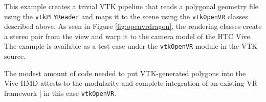 This example creates a trivial VTK pipeline that reads a polygonal geometry file
using the \texttt{vtkPLYReader} and maps it to the scene using the \texttt{vtkOpenVR}
classes described above. As seen in Figure \ref{fig:openvrdragon}, the rendering
classes create a stereo pair from the view and warp it to the camera model of
the HTC Vive. 
The example is available as a test case under the
\texttt{vtkOpenVR} module in the VTK source.

The modest amount of code needed to put VTK-generated polygons into the
Vive HMD attests to the modularity and complete integration of an
existing VR framework | in this case \texttt{vtkOpenVR}.

